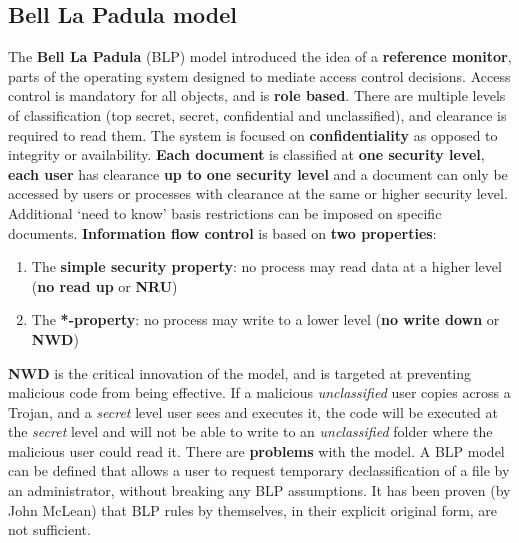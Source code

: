 \documentclass{article}
\begin{document}
\subsection{Bell La Padula model}
The \textbf{Bell La Padula} (BLP) model introduced the idea of a \textbf{reference monitor}, parts of the operating system designed to mediate access control decisions. Access control is mandatory for all objects, and is \textbf{role based}. There are multiple levels of classification (top secret, secret, confidential and unclassified), and clearance is required to read them. The system is focused on \textbf{confidentiality} as opposed to integrity or availability. \textbf{Each document} is classified at \textbf{one security level}, \textbf{each user} has clearance \textbf{up to one security level} and a document can only be accessed by users or processes with clearance at the same or higher security level. Additional `need to know' basis restrictions can be imposed on specific documents. \textbf{Information flow control} is based on \textbf{two properties}:
\begin{enumerate}
	\item The \textbf{simple security property}: no process may read data at a higher level (\textbf{no read up} or \textbf{NRU})
	\item The \textbf{*-property}: no process may write to a lower level (\textbf{no write down} or \textbf{NWD})
\end{enumerate}
\textbf{NWD} is the critical innovation of the model, and is targeted at preventing malicious code from being effective. If a malicious \textit{unclassified} user copies across a Trojan, and a \textit{secret} level user sees and executes it, the code will be executed at the \textit{secret} level and will not be able to write to an \textit{unclassified} folder where the malicious user could read it. There are \textbf{problems} with the model. A BLP model can be defined that allows a user to request temporary declassification of a file by an administrator, without breaking any BLP assumptions. It has been proven (by John McLean) that BLP rules by themselves, in their explicit original form, are not sufficient.
\end{document}

